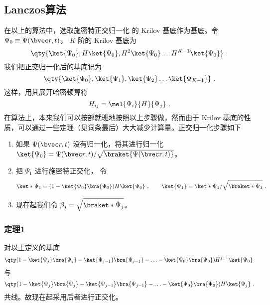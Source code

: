 \subsection{Lanczos算法}
在以上的算法中，选取施密特正交归一化 %
的 Krilov 基底作为基底。令 $\Psi_0 \equiv \Psi(\bvec r, t)$，  $K$ 阶的 Krilov 基底为
 \begin{equation}
\qty{ \ket{\Psi_0}, H \ket{\Psi_0}, H^2 \ket{\Psi_0} \dots H^{K-1} \ket{\Psi_0}}~.
\end{equation}
我们把正交归一化后的基底记为
\begin{equation}
\qty{ \ket{\Psi_0}, \ket{\Psi_1}, \ket{\Psi_2} \dots \ket{\Psi_{K-1}} }~.
\end{equation}
这样，用其展开哈密顿算符
\begin{equation}
H_{ij}=\mel{\Psi_i}{H}{\Psi_j}~.
\end{equation}
在算法上，本来我们可以按部就班地按照以上步骤做，然而由于 Krilov 基底的性质，可以通过一些定理（见词条最后）大大减少计算量。正交归一化步骤如下

\begin{enumerate}
\item 如果 $\Psi(\bvec r,t)$ 没有归一化，将其进行归一化 $\ket{\Psi_0}=\Psi(\bvec r,t)/\sqrt{\braket{\Psi(\bvec r,t)}}$。
\item 把 $\Psi_1$ 进行施密特正交化， 令
\begin{equation}
\ket*{\tilde\Psi_1} = (1 - \ket{\Psi_0}\bra{\Psi_0})H \ket{\Psi_0}~,
\qquad
\ket{\Psi_1}=\ket*{\tilde\Psi_1}/\sqrt{\braket*{\tilde\Psi_1}}~.
\end{equation}
\item 现在起我们令 $\beta_j = \sqrt{\braket*{\tilde\Psi_j}}$。 %
\end{enumerate}

\subsubsection{定理1}
对以上定义的基底
\begin{equation}
\qty(1 - \ket{\Psi_j} \bra{\Psi_j} - \ket{\Psi_{j - 1}} \bra{\Psi_{j - 1}} - \ldots - \ket{\Psi_0} \bra{\Psi_0}) H^{j + 1} \ket{\Psi_0}~
\end{equation}
与
\begin{equation}
\qty( 1 - \ket{\Psi_j}\bra{\Psi_j} - \ket{\Psi_{j - 1}}\bra{\Psi_{j - 1}} - \ldots - \ket{\Psi_0}\bra{\Psi_0}) H \ket{\Psi_j}~.
\end{equation}
共线。故现在起采用后者进行正交化。

